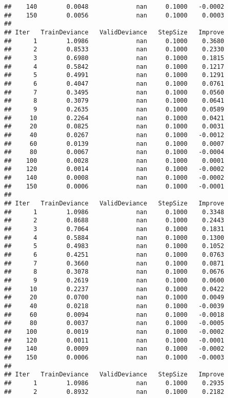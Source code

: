 \documentclass[
]{article}
\begin{document}
\begin{verbatim}
##    140        0.0048             nan     0.1000   -0.0002
##    150        0.0056             nan     0.1000    0.0003
## 
## Iter   TrainDeviance   ValidDeviance   StepSize   Improve
##      1        1.0986             nan     0.1000    0.3680
##      2        0.8533             nan     0.1000    0.2330
##      3        0.6980             nan     0.1000    0.1815
##      4        0.5842             nan     0.1000    0.1217
##      5        0.4991             nan     0.1000    0.1291
##      6        0.4047             nan     0.1000    0.0761
##      7        0.3495             nan     0.1000    0.0560
##      8        0.3079             nan     0.1000    0.0641
##      9        0.2635             nan     0.1000    0.0589
##     10        0.2264             nan     0.1000    0.0421
##     20        0.0825             nan     0.1000    0.0031
##     40        0.0267             nan     0.1000   -0.0012
##     60        0.0139             nan     0.1000    0.0007
##     80        0.0067             nan     0.1000   -0.0004
##    100        0.0028             nan     0.1000    0.0001
##    120        0.0014             nan     0.1000   -0.0002
##    140        0.0008             nan     0.1000   -0.0002
##    150        0.0006             nan     0.1000   -0.0001
## 
## Iter   TrainDeviance   ValidDeviance   StepSize   Improve
##      1        1.0986             nan     0.1000    0.3348
##      2        0.8688             nan     0.1000    0.2443
##      3        0.7064             nan     0.1000    0.1831
##      4        0.5884             nan     0.1000    0.1300
##      5        0.4983             nan     0.1000    0.1052
##      6        0.4251             nan     0.1000    0.0763
##      7        0.3660             nan     0.1000    0.0871
##      8        0.3078             nan     0.1000    0.0676
##      9        0.2619             nan     0.1000    0.0600
##     10        0.2237             nan     0.1000    0.0422
##     20        0.0700             nan     0.1000    0.0049
##     40        0.0218             nan     0.1000   -0.0039
##     60        0.0094             nan     0.1000   -0.0018
##     80        0.0037             nan     0.1000   -0.0005
##    100        0.0019             nan     0.1000   -0.0002
##    120        0.0011             nan     0.1000   -0.0001
##    140        0.0009             nan     0.1000   -0.0002
##    150        0.0006             nan     0.1000   -0.0003
## 
## Iter   TrainDeviance   ValidDeviance   StepSize   Improve
##      1        1.0986             nan     0.1000    0.2935
##      2        0.8932             nan     0.1000    0.2182

\end{verbatim}
\end{document}
